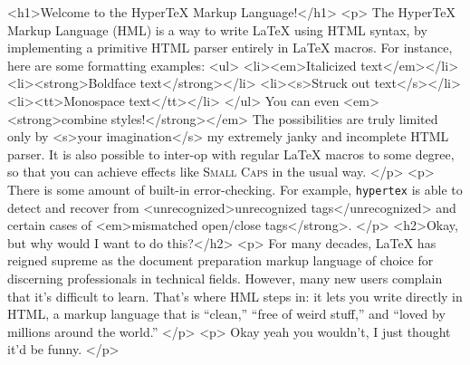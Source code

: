 \documentclass{article}
\begin{document}
\begin{html}
  <h1>Welcome to the Hyper\TeX{} Markup Language!</h1>
  <p>
    The Hyper\TeX{} Markup Language (HML) is a way to write \LaTeX{}
    using HTML syntax, by implementing a primitive HTML parser entirely
    in \LaTeX{} macros. For instance, here are some formatting examples:
    <ul>
      <li><em>Italicized text</em></li>
      <li><strong>Boldface text</strong></li>
      <li><s>Struck out text</s></li>
      <li><tt>Monospace text</tt></li>
    </ul>
    You can even <em><strong>combine styles!</strong></em> The
    possibilities are truly limited only by <s>your imagination</s> my
    extremely janky and incomplete HTML parser. It is also possible to
    inter-op with regular \LaTeX{} macros to some degree, so that you
    can achieve effects like \textsc{Small Caps} in the usual way.
  </p>
  <p>
    There is some amount of built-in error-checking. For example,
    \texttt{hypertex} is able to detect and recover from
    <unrecognized>unrecognized tags</unrecognized> and certain cases of
    <em>mismatched open/close tags</strong>.
  </p>
  <h2>Okay, but why would I want to do this?</h2>
  <p>
    For many decades, \LaTeX{} has reigned supreme as the document
    preparation markup language of choice for discerning professionals
    in technical fields. However, many new users complain that it's
    difficult to learn. That's where HML steps in: it lets you write
    directly in HTML, a markup language that is ``clean,'' ``free of
    weird stuff,'' and ``loved by millions around the world.''
  </p>
  <p>
    Okay yeah you wouldn't, I just thought it'd be funny.
  </p>
\end{html}
\end{document}
